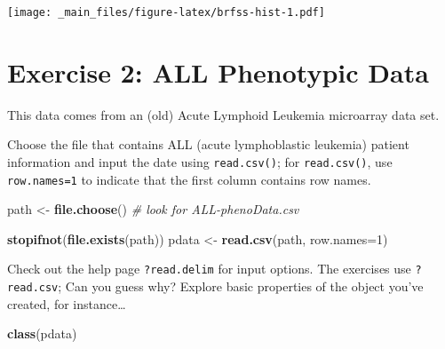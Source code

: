 \documentclass[]{article}
\newenvironment{Shaded}{\begin{snugshade}}{\end{snugshade}}
\newcommand{\KeywordTok}[1]{\textcolor[rgb]{0.13,0.29,0.53}{\textbf{#1}}}
\newcommand{\DataTypeTok}[1]{\textcolor[rgb]{0.13,0.29,0.53}{#1}}
\newcommand{\DecValTok}[1]{\textcolor[rgb]{0.00,0.00,0.81}{#1}}
\newcommand{\StringTok}[1]{\textcolor[rgb]{0.31,0.60,0.02}{#1}}
\newcommand{\CommentTok}[1]{\textcolor[rgb]{0.56,0.35,0.01}{\textit{#1}}}
\newcommand{\OperatorTok}[1]{\textcolor[rgb]{0.81,0.36,0.00}{\textbf{#1}}}
\newcommand{\NormalTok}[1]{#1}
\theoremstyle{definition}
\theoremstyle{definition}
\theoremstyle{remark}
\begin{document}
\begin{enumerate}
\begin{Shaded}
\end{Shaded}

  \texttt{[image: \_main\_files/figure-latex/brfss-hist-1.pdf]}
\end{enumerate}

\section{Exercise 2: ALL Phenotypic
Data}\label{exercise-2-all-phenotypic-data}

This data comes from an (old) Acute Lymphoid Leukemia microarray data
set.

Choose the file that contains ALL (acute lymphoblastic leukemia) patient
information and input the date using \texttt{read.csv()}; for
\texttt{read.csv()}, use \texttt{row.names=1} to indicate that the first
column contains row names.

\begin{Shaded}
\begin{Highlighting}[]
\NormalTok{path <-}\StringTok{ }\KeywordTok{file.choose}\NormalTok{()    }\CommentTok{# look for ALL-phenoData.csv}
\end{Highlighting}
\end{Shaded}

\begin{Shaded}
\begin{Highlighting}[]
\KeywordTok{stopifnot}\NormalTok{(}\KeywordTok{file.exists}\NormalTok{(path))}
\NormalTok{pdata <-}\StringTok{ }\KeywordTok{read.csv}\NormalTok{(path, }\DataTypeTok{row.names=}\DecValTok{1}\NormalTok{)}
\end{Highlighting}
\end{Shaded}

Check out the help page \texttt{?read.delim} for input options. The
exercises use \texttt{?read.csv}; Can you guess why? Explore basic
properties of the object you've created, for instance\ldots{}

\begin{Shaded}
\begin{Highlighting}[]
\KeywordTok{class}\NormalTok{(pdata)}
\end{Highlighting}
\end{Shaded}
\end{document}
